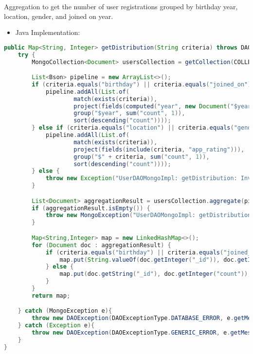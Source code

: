 Aggregation to get the number of user registrations grouped by birthday year, location,
gender, and joined on year.

\begin{itemize}
    \item Java Implementation:
\end{itemize}
\begin{mdframed}[style=customstyle]
\begin{lstlisting}[language=java]
public Map<String, Integer> getDistribution(String criteria) throws DAOException {
    try {
        MongoCollection<Document> usersCollection = getCollection(COLLECTION_NAME);

        List<Bson> pipeline = new ArrayList<>();
        if (criteria.equals("birthday") || criteria.equals("joined_on")) {
            pipeline.addAll(List.of(
                    match(exists(criteria)),
                    project(fields(computed("year", new Document("$year", "$" + criteria)), include("app_rating" ))),
                    group("$year", sum("count", 1)),
                    sort(descending("count"))));
        } else if (criteria.equals("location") || criteria.equals("gender")) {
            pipeline.addAll(List.of(
                    match(exists(criteria)),
                    project(fields(include(criteria, "app_rating"))),
                    group("$" + criteria, sum("count", 1)),
                    sort(descending("count"))));
        } else {
            throw new Exception("UserDAOMongoImpl: getDistribution: Invalid criteria");
        }

        List<Document> aggregationResult = usersCollection.aggregate(pipeline).into(new ArrayList<>());
        if (aggregationResult.isEmpty()) {
            throw new MongoException("UserDAOMongoImpl: getDistribution: No data found");
        }

        Map<String,Integer> map = new LinkedHashMap<>();
        for (Document doc : aggregationResult) {
            if (criteria.equals("birthday") || criteria.equals("joined_on")) {
                map.put(String.valueOf(doc.getInteger("_id")), doc.getInteger("count"));
            } else {
                map.put(doc.getString("_id"), doc.getInteger("count"));
            }
        }
        return map;

    } catch (MongoException e){
        throw new DAOException(DAOExceptionType.DATABASE_ERROR, e.getMessage());
    } catch (Exception e){
        throw new DAOException(DAOExceptionType.GENERIC_ERROR, e.getMessage());
    }
}\end{lstlisting}
\end{mdframed}

